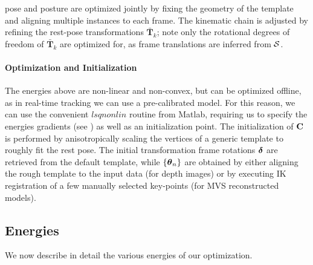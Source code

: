 pose and posture are optimized jointly by fixing the geometry of the template and aligning multiple instances to each frame. The kinematic chain is adjusted by refining the rest-pose transformations $\mathbf{\bar{T}}_k$; note only the rotational degrees of freedom of $\mathbf{\bar{T}}_k$ are optimized for, as frame translations are inferred from $\mathcal{S}$. 

\paragraph{Optimization and Initialization}
The energies above are non-linear and non-convex, but can be optimized offline, as in real-time tracking we can use a pre-calibrated model. For this reason, we can use the convenient $lsqnonlin$ routine from Matlab, requiring us to specify the energies gradients (see ) as well as an initialization point. The initialization of ${\mathbf{C}}$ is performed  by anisotropically scaling the vertices of a generic template to roughly fit the rest pose. The initial transformation frame rotations $\boldsymbol{\delta}$ are retrieved from the default template, while ${\{\boldsymbol{\theta}_n\}}$ are obtained by either aligning the rough template to the input data (for depth images) or by executing IK registration of a few manually selected key-points (for MVS reconstructed models).



\subsection{Energies}
We now describe in detail the various energies of our optimization.

